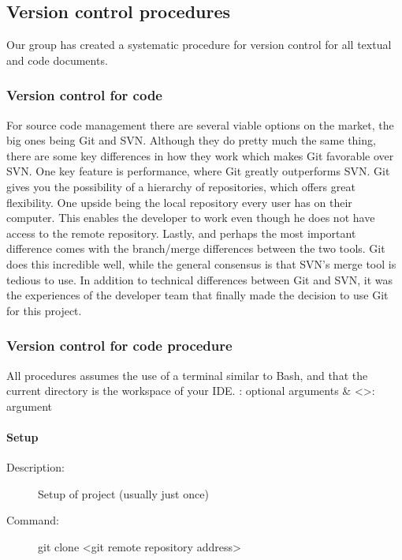 

\subsection{Version control procedures}
Our group has created a systematic procedure for version control for all textual  and code documents. 

\subsubsection{Version control for code}
For source code management there are several viable options on the market, the big ones being Git and SVN. Although they do pretty much the same thing, there are some key differences in how they work which makes Git favorable over SVN. One key feature is performance, where Git greatly outperforms SVN. Git gives you the possibility of a hierarchy of repositories, which offers great flexibility. One upside being the local repository every user has on their computer. This enables the developer to work even though he does not have access to the remote repository. Lastly, and perhaps the most important difference comes with the branch/merge differences between the two tools. Git does this incredible well, while the general consensus is that SVN’s merge tool is tedious to use.  
\newline
\newline
In addition to technical differences between Git and SVN, it was the experiences of the developer team that finally made the decision to use Git for this project.

\subsubsection{Version control for code procedure}
All procedures assumes the use of a terminal similar to Bash, and that the current directory is the workspace of your IDE.
\newline
\newline
[]: optional arguments \& <>: argument

\paragraph{Setup}
\begin{description}
\item[Description:] Setup of project (usually just once)
\item[Command:] git clone <git remote repository address>
\end{description}

